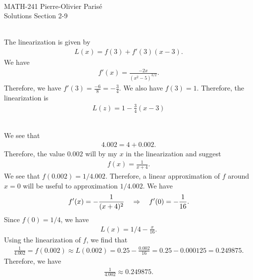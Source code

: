 


	\noindent \hrulefill \\
	MATH-241 \hfill Pierre-Olivier Paris{\'e}\\
	Solutions Section 2-9 \hfill \semester \\\vspace*{-1cm}
	
	\noindent\hrulefill
	
	\spc

	\\
	The linearization is given by
		\begin{align*}
		L (x) = f(3) + f'(3) (x - 3)  .
		\end{align*}
	We have 
		\begin{align*}
		f' (x) = \frac{-2x}{(x^2 - 5)^{3/2}} .
		\end{align*}
	Therefore, we have $f'(3) = \frac{-6}{8} = -\frac{3}{4}$. We also have $f(3) = 1$. Therefore, the linearization is
		\begin{align*}
		L (z) = 1 -\frac{3}{4} (x - 3)
		\end{align*}	
		
	\spc
	
	\\
	We see that
		\begin{align*}
		4.002 = 4 + 0.002 .
		\end{align*}		
	Therefore, the value $0.002$ will by my $x$ in the linearization and suggest
		\begin{align*}
		f(x) = \frac{1}{x + 4} .
		\end{align*}
	We see that $f(0.002) = 1/4.002$. Therefore, a linear approximation of $f$ around $x = 0$ will be useful to approximation $1/4.002$. We have
		\begin{align*}
		f'(x) = - \frac{1}{(x + 4)^2} \quad \Rightarrow \quad f' (0) = - \frac{1}{16} .
		\end{align*}
	Since $f(0) = 1/4$, we have
		\begin{align*}
		L (x) = 1/4 - \frac{x}{16} .
		\end{align*}
	Using the linearization of $f$, we find that
		\begin{align*}
		\frac{1}{4.002} = f(0.002) \approx L(0.002) = 0.25 - \frac{0.002}{16} = 0.25 - 0.000125 = 0.249875 .
		\end{align*}
	Therefore, we have
		\begin{align*}
		\frac{1}{4.002} \approx 0.249875 .
		\end{align*}
		
	
